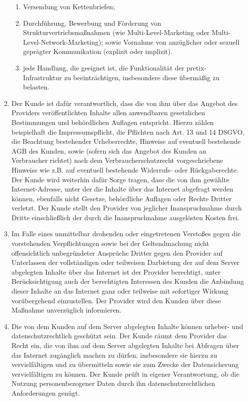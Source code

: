 \documentclass{terms}
\begin{document}
\begin{enumerate}
\begin{enumerate}
\item Versendung von Kettenbriefen;
\item Durchführung, Bewerbung und Förderung von Strukturvertriebsmaßnahmen (wie Multi-Level-Marketing oder Multi-Level-Network-Marketing); sowie Vornahme von anzüglicher oder sexuell geprägter Kommunikation (explizit oder implizit).
\item jede Handlung, die geeignet ist, die Funktionalität der pretix-Infrastruktur zu beeinträchtigen, insbesondere diese übermäßig zu belasten.
\end{enumerate}

\item Der Kunde ist dafür verantwortlich, dass die von ihm über das Angebot des Providers veröffentlichten Inhalte allen anwendbaren gesetzlichen Bestimmungen und behördlichen Auflagen entspricht. Hierzu zählen beispielhaft die Impressumspflicht, die Pflichten nach Art. 13 und 14 DSGVO, die Beachtung bestehender Urheberrechte, Hinweise auf eventuell bestehende AGB des Kunden, sowie (sofern sich das Angebot des Kunden an Verbraucher richtet) nach dem Verbraucherschutzrecht vorgeschriebene Hinweise wie z.B. auf eventuell bestehende Widerrufs- oder Rückgaberechte. Der Kunde wird weiterhin dafür Sorge tragen, dass die von ihm gewählte Internet-Adresse, unter der die Inhalte über das Internet abgefragt werden können, ebenfalls nicht Gesetze, behördliche Auflagen oder Rechte Dritter verletzt. Der Kunde stellt den Provider von jeglicher Inanspruchnahme durch Dritte einschließlich der durch die Inanspruchnahme ausgelösten Kosten frei.
\item Im Falle eines unmittelbar drohenden oder eingetretenen Verstoßes gegen die vorstehenden Verpflichtungen sowie bei der Geltendmachung nicht offensichtlich unbegründeter Ansprüche Dritter gegen den Provider auf Unterlassen der vollständigen oder teilweisen Darbietung der auf dem Server abgelegten Inhalte über das Internet ist der Provider berechtigt, unter Berücksichtigung auch der berechtigten Interessen des Kunden die Anbindung dieser Inhalte an das Internet ganz oder teilweise mit sofortiger Wirkung vorübergehend einzustellen. Der Provider wird den Kunden über diese Maßnahme unverzüglich informieren.
\item Die von dem Kunden auf dem Server abgelegten Inhalte können urheber- und datenschutzrechtlich geschützt sein. Der Kunde räumt dem Provider das Recht ein, die von ihm auf dem Server abgelegten Inhalte bei Abfragen über das Internet zugänglich machen zu dürfen, insbesondere sie hierzu zu vervielfältigen und zu übermitteln sowie sie zum Zwecke der Datensicherung vervielfältigen zu können. Der Kunde prüft in eigener Verantwortung, ob die Nutzung personenbezogener Daten durch ihn datenschutzrechtlichen Anforderungen genügt.

\end{enumerate}
\end{document}

